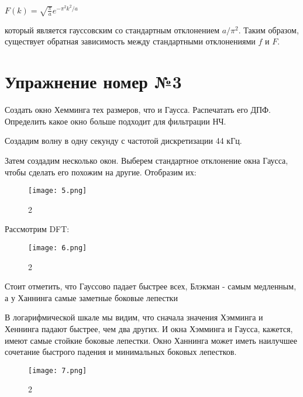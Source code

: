 \documentclass[10pt,a4paper,oneside]{article}
\begin{document}
$F(k) = \sqrt{\frac{\pi}{a}} e^{-\pi^2 k^2/a}$

который является гауссовским со стандартным отклонением $a / \pi^2$. Таким образом, существует обратная зависимость между стандартными отклонениями $f$ и $F$.

\section{Упражнение номер №3}

Создать окно Хемминга тех размеров, что и Гаусса. Распечатать его ДПФ. Определить какое окно больше подходит для фильтрации НЧ.

Создадим волну в одну секунду с частотой дискретизации 44 кГц.

Затем создадим несколько окон. Выберем стандартное отклонение окна Гаусса, чтобы сделать его похожим на другие. Отобразим их:

\begin{figure}[H]
        \centering
        \texttt{[image: 5.png]}
        \caption{2}
        \label{fig:first}
\end{figure}

Рассмотрим DFT:

\begin{figure}[H]
        \centering
        \texttt{[image: 6.png]}
        \caption{2}
        \label{fig:first}
\end{figure}

Стоит отметить, что Гауссово падает быстрее всех, Блэкман - самым медленным, а у Ханнинга самые заметные боковые лепестки

В логарифмической шкале мы видим, что сначала значения Хэмминга и Хеннинга падают быстрее, чем два других. И окна Хэмминга и Гаусса, кажется, имеют самые стойкие боковые лепестки. Окно Ханнинга может иметь наилучшее сочетание быстрого падения и минимальных боковых лепестков.

\begin{figure}[H]
        \centering
        \texttt{[image: 7.png]}
        \caption{2}
        \label{fig:first}
\end{figure}
\end{document}
